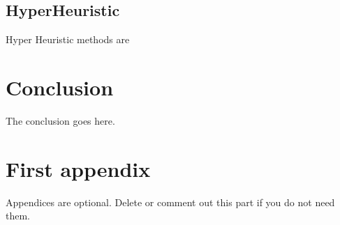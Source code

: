 \documentclass[journal]{IEEEtran}
\begin{document}
\cite{EfficientBFS}

\subsection{HyperHeuristic}
Hyper Heuristic methods are 
\cite{hyperHeurisicMendes}

\section{Conclusion}
The conclusion goes here.






\appendices
\section{First appendix}
Appendices are optional. Delete or comment out this part if you do not need them.

\end{document}

